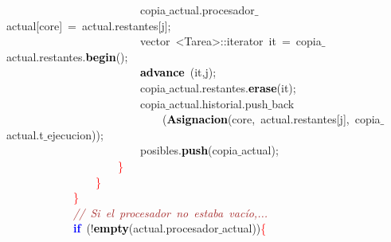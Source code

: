 \mbox{}\ \ \ \ \ \ \ \ \ \ \ \ \ \ \ \ \ \ \ \ \ \ \ \ copia$\_$actual\textcolor{BrickRed}{.}procesador$\_$actual\textcolor{BrickRed}{[}core\textcolor{BrickRed}{]}\ \textcolor{BrickRed}{=}\ actual\textcolor{BrickRed}{.}restantes\textcolor{BrickRed}{[}j\textcolor{BrickRed}{];} \\
\mbox{}\ \ \ \ \ \ \ \ \ \ \ \ \ \ \ \ \ \ \ \ \ \ \ \ vector\ \textcolor{BrickRed}{\textless{}}Tarea\textcolor{BrickRed}{\textgreater{}::}\textcolor{TealBlue}{iterator}\ it\ \textcolor{BrickRed}{=}\ copia$\_$actual\textcolor{BrickRed}{.}restantes\textcolor{BrickRed}{.}\textbf{\textcolor{Black}{begin}}\textcolor{BrickRed}{();} \\
\mbox{}\ \ \ \ \ \ \ \ \ \ \ \ \ \ \ \ \ \ \ \ \ \ \ \ \textbf{\textcolor{Black}{advance}}\ \textcolor{BrickRed}{(}it\textcolor{BrickRed}{,}j\textcolor{BrickRed}{);} \\
\mbox{}\ \ \ \ \ \ \ \ \ \ \ \ \ \ \ \ \ \ \ \ \ \ \ \ copia$\_$actual\textcolor{BrickRed}{.}restantes\textcolor{BrickRed}{.}\textbf{\textcolor{Black}{erase}}\textcolor{BrickRed}{(}it\textcolor{BrickRed}{);} \\
\mbox{}\ \ \ \ \ \ \ \ \ \ \ \ \ \ \ \ \ \ \ \ \ \ \ \ copia$\_$actual\textcolor{BrickRed}{.}historial\textcolor{BrickRed}{.}push$\_$back \\
\mbox{}\ \ \ \ \ \ \ \ \ \ \ \ \ \ \ \ \ \ \ \ \ \ \ \ \ \ \ \ \textcolor{BrickRed}{(}\textbf{\textcolor{Black}{Asignacion}}\textcolor{BrickRed}{(}core\textcolor{BrickRed}{,}\ actual\textcolor{BrickRed}{.}restantes\textcolor{BrickRed}{[}j\textcolor{BrickRed}{],}\ copia$\_$actual\textcolor{BrickRed}{.}t$\_$ejecucion\textcolor{BrickRed}{));} \\
\mbox{}\ \ \ \ \ \ \ \ \ \ \ \ \ \ \ \ \ \ \ \ \ \ \ \ posibles\textcolor{BrickRed}{.}\textbf{\textcolor{Black}{push}}\textcolor{BrickRed}{(}copia$\_$actual\textcolor{BrickRed}{);} \\
\mbox{}\ \ \ \ \ \ \ \ \ \ \ \ \ \ \ \ \ \ \ \ \textcolor{Red}{\}} \\
\mbox{}\ \ \ \ \ \ \ \ \ \ \ \ \ \ \ \ \textcolor{Red}{\}} \\
\mbox{}\ \ \ \ \ \ \ \ \ \ \ \ \textcolor{Red}{\}} \\
\mbox{}\ \ \ \ \ \ \ \ \ \ \ \ \textit{\textcolor{Brown}{//\ Si\ el\ procesador\ no\ estaba\ vacío,...}} \\
\mbox{}\ \ \ \ \ \ \ \ \ \ \ \ \textbf{\textcolor{Blue}{if}}\ \textcolor{BrickRed}{(!}\textbf{\textcolor{Black}{empty}}\textcolor{BrickRed}{(}actual\textcolor{BrickRed}{.}procesador$\_$actual\textcolor{BrickRed}{))}\textcolor{Red}{\{} \\
